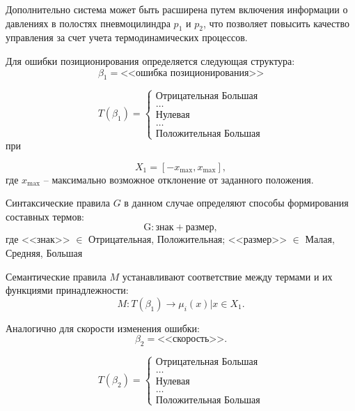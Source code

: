 Дополнительно система может быть расширена путем включения информации о
давлениях в полостях пневмоцилиндра $p_1$ и $p_2$, что позволяет повысить
качество управления за счет учета термодинамических процессов.

Для ошибки позиционирования определяется следующая структура:
\begin{equation}
	\beta_1 = \text{<<ошибка позиционирования>>}
\end{equation}

\begin{equation}
	T(\beta_1) =\begin{cases}
		\text{Отрицательная Большая} \\
		\ldots                       \\
		\text{Нулевая}               \\
		\ldots                       \\
		\text{Положительная Большая}
	\end{cases}
\end{equation}
при

\begin{equation}
	X_1 = [-x_{\text{max}}, x_{\text{max}}],
\end{equation}
где $x_{\text{max}}$ -- максимально возможное отклонение от заданного положения.

Синтаксические правила $G$ в данном случае определяют способы формирования составных термов:
\begin{equation}
	\text{G}: \text{знак} + \text{размер},
\end{equation}
где <<знак>> $\in$ {Отрицательная, Положительная}; <<размер>> $\in$ {Малая, Средняя, Большая}

Семантические правила $M$ устанавливают соответствие между термами и их функциями принадлежности:
\begin{equation}
	M: T(\beta_1) \rightarrow {\mu_i(x) | x \in X_1}.
\end{equation}

Аналогично для скорости изменения ошибки:
\begin{equation}
	\beta_2 = \text{<<скорость>>}.
\end{equation}

\begin{equation}
	T(\beta_2) =\begin{cases}
		\text{Отрицательная Большая} \\
		\ldots                       \\
		\text{Нулевая}               \\
		\ldots                       \\
		\text{Положительная Большая}
	\end{cases}
\end{equation}


